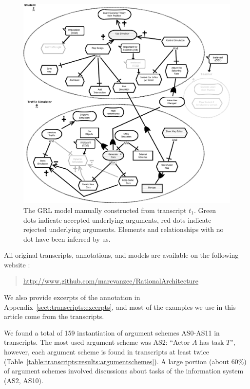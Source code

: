 \begin{figure}[h!]
\includegraphics[width=\textwidth]{img/Fig6}
\caption{The GRL model manually constructed from transcript $t_1$. Green dots indicate accepted underlying arguments, red dots indicate rejected underlying arguments. Elements and relationships with no dot have been inferred by us.}
\label{fig:transcripts:grl}
\end{figure} %

All original transcripts, annotations, and models are available on the following website :
\begin{quote} \url{http://www.github.com/marcvanzee/RationalArchitecture}
\end{quote}
We also provide excerpts of the annotation in Appendix~\ref{sect:transcripts:excerpts}, and most of the examples we use in this article come from the transcripts.

We found a total of 159 instantiation of argument schemes AS0-AS11 in transcripts. The most used argument scheme was AS2: ``Actor $A$ has task $T$'', however, each argument scheme is found in transcripts at least twice (Table~\ref{table:transcripts:results:argumentschemes}). A large portion (about 60\%) of argument schemes involved discussions about tasks of the information system (AS2, AS10).

